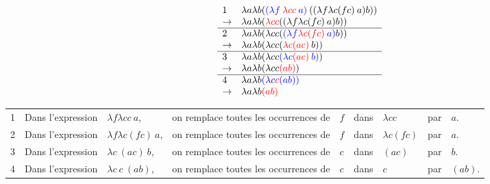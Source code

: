 \begin{myexem}
$$\begin{array}{ll}
	1 &\lambda a \lambda b ( \textcolor{blue}{(\lambda f \: \textcolor{red}{\lambda c c} \: a)} \: (( \lambda f \lambda c (f c)\: a) b))\\
	\rightarrow &\lambda a \lambda b ( \textcolor{red}{\lambda c c} (( \lambda f \lambda c (f c)\: a) b))\\
	\hline
	2 &\lambda a \lambda b ( \lambda c c (\textcolor{blue}{( \lambda f \textcolor{red}{\lambda c (f c)}\: a)} b))\\
	\rightarrow &\lambda a \lambda b ( \lambda c c ( \textcolor{red}{\lambda c (a c)}\: b))\\
	\hline
	3 &\lambda a \lambda b ( \lambda c c \textcolor{blue}{( \lambda c \textcolor{red}{(a c)}\: b)})\\
	\rightarrow &\lambda a \lambda b ( \lambda c c  \textcolor{red}{(a b)} )\\
	\hline
	4 &\lambda a \lambda b \textcolor{blue}{( \lambda c \textcolor{red}{c}  (a b) )}\\
	\rightarrow &\lambda a \lambda b  \textcolor{red}{(a b)} \\

\end{array}$$
\begin{tabular}{lllllllll}
	1 & Dans l'expression & $\lambda f \lambda c c \:a$,& on remplace toutes les occurrences de & $f$ & dans & $\lambda c c$ & par & $a$.\\
	2 & Dans l'expression & $\lambda f \lambda c (f c)\: a$,& on remplace toutes les occurrences de & $f$ & dans & $\lambda c (f c)$ & par & $a$.\\
	3 & Dans l'expression & $\lambda c\: (a c)\: b$,& on remplace toutes les occurrences de & $c$ & dans & $(a c)$ & par & $b$.\\
	4 & Dans l'expression & $\lambda c \:c \:  (a b)$,& on remplace toutes les occurrences de & $c$ & dans & $c$ & par & $(a b)$.\\
\end{tabular}
\end{myexem}

